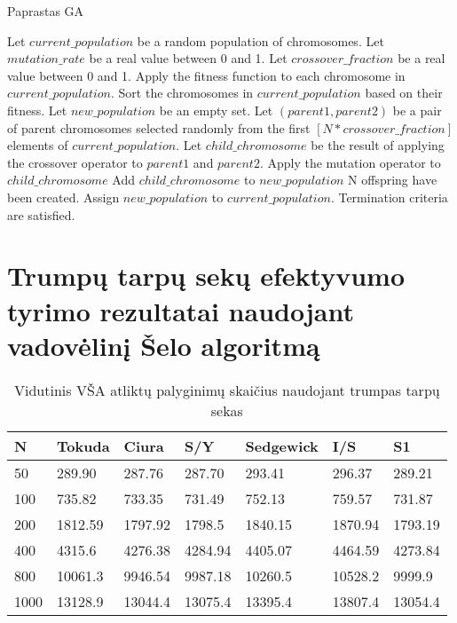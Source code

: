 \documentclass{VUMIFInfKursinis}
\begin{document}
\begin{algorithm}[H]
  \caption{Paprastas GA}\label{simple_GA}
  \begin{algorithmic}
    \State Let $current\_population$ be a random population of chromosomes.
    \State Let $mutation\_rate$ be a real value between 0 and 1.
    \State Let $crossover\_fraction$ be a real value between 0 and 1.
    \Repeat
      \State Apply the fitness function to each chromosome in $current\_population$.
      \State Sort the chromosomes in $current\_population$ based on their fitness. %
      \State Let $new\_population$ be an empty set.
      \Repeat
        \State Let $(parent1, parent2)$ be a pair of parent chromosomes selected randomly from the first $[N * crossover\_fraction]$ elements of $current\_population$.
        \State Let $child\_chromosome$ be the result of applying the crossover operator to $parent1$ and $parent2$.
          \State Apply the mutation operator to $child\_chromosome$
        \EndIf
        \State Add $child\_chromosome$ to $new\_population$
      \Until N offspring have been created.
      \State Assign $new\_population$ to $current\_population$.
    \Until Termination criteria are satisfied.
  \end{algorithmic}
\end{algorithm}

\section{Trumpų tarpų sekų efektyvumo tyrimo rezultatai naudojant vadovėlinį Šelo algoritmą}

\begin{table}[H]
  \caption{Vidutinis VŠA atliktų palyginimų skaičius naudojant trumpas tarpų sekas}
  \label{tss_small_comparisons}
  \begin{tabular}{|l|l|l|l|l|l|l|}
  \hline
  N    & Tokuda  & Ciura   & S/Y     & Sedgewick & I/S     & S1      \\ \hline
  50   & 289.90  & 287.76  & 287.70  & 293.41    & 296.37  & 289.21  \\ \hline
  100  & 735.82  & 733.35  & 731.49  & 752.13    & 759.57  & 731.87  \\ \hline
  200  & 1812.59 & 1797.92 & 1798.5  & 1840.15   & 1870.94 & 1793.19 \\ \hline
  400  & 4315.6  & 4276.38 & 4284.94 & 4405.07   & 4464.59 & 4273.84 \\ \hline
  800  & 10061.3 & 9946.54 & 9987.18 & 10260.5   & 10528.2 & 9999.9  \\ \hline
  1000 & 13128.9 & 13044.4 & 13075.4 & 13395.4   & 13807.4 & 13054.4 \\ \hline
  \end{tabular}
  \end{table}
\end{document}
